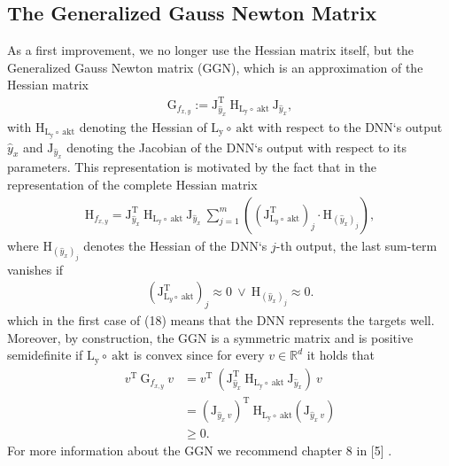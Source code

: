 \documentclass[conference]{IEEEtran}
\begin{document}
\subsection{The Generalized Gauss Newton Matrix}
As a first improvement, we no longer use the Hessian matrix itself, but the Generalized Gauss Newton matrix (GGN), which is an approximation of the Hessian matrix
\begin{align}
\mathrm{G}_{f_{x, y}} := \mathrm{J}_{\hat{y}_{x}}^{\mathrm{T}}\:\mathrm{H}_{\mathrm{L_{y}\circ\:\text{akt}}}\:\mathrm{J}_{\hat{y}_{x}},
\end{align}
with $\mathrm{H}_{\mathrm{L_{y}\circ\:\text{akt}}}$ denoting the Hessian of $\mathrm{L_{y}\circ\:\text{akt}}$ with respect to the DNN`s output $\hat{y}_{x}$ and $\mathrm{J}_{\hat{y}_{x}}$ denoting the Jacobian of the DNN`s output with respect to its parameters.
This representation is motivated by the fact that in the representation of the complete Hessian matrix
\begin{align}
\mathrm{H}_{f_{x, y}} = \mathrm{J}_{\hat{y}_{x}}^{\mathrm{T}}\:\mathrm{H}_{\mathrm{L_{y}\circ\:\text{akt}}}\:\mathrm{J}_{\hat{y}_{x}}\:\sum_{j = 1}^{m}\left(\left(\mathrm{J}_{\mathrm{L}_{y}\circ \:\text{akt}}^{\mathrm{T}}\right)_{j}\cdot\mathrm{H}_{(\hat{y}_{x})_{j}}\right),
\end{align}
where $\mathrm{H}_{(\hat{y}_{x})_{j}}$ denotes the Hessian of the DNN`s  $j$-th output, the last sum-term vanishes if 
\begin{align}
\left(\mathrm{J}_{\mathrm{L}_{y}\circ \:\text{akt}}^{\mathrm{T}}\right)_{j}\approx 0\:\lor\:\mathrm{H}_{(\hat{y}_{x})_{j}} \approx 0.
\end{align}
which in the first case of (18) means that the DNN represents the targets well.  Moreover, by construction, the GGN is a symmetric matrix and is positive semidefinite if $\mathrm{L_{y}\circ\:\text{akt}}$ is convex since for every $v\in\mathbb{R}^{d}$ it holds that
\begin{align}
v^{\mathrm{T}}\:\mathrm{G}_{f_{x, y}}\:v &= v^{\mathrm{T}}\:\left( \mathrm{J}_{\hat{y}_{x}}^{\mathrm{T}}\:\mathrm{H}_{\mathrm{L_{y}\circ\:\text{akt}}}\:\mathrm{J}_{\hat{y}_{x}}\right)\:v\\
&= \left(\mathrm{J}_{\hat{y}_{x}\:v}\right)^{\mathrm{T}}\:\mathrm{H}_{\mathrm{L_{y}\circ\:\text{akt}}}\left(\mathrm{J}_{\hat{y}_{x}\:v}\right) \\
&\geq 0.
\end{align}
For more information about the GGN we recommend chapter 8 in [5] .
\end{document}
